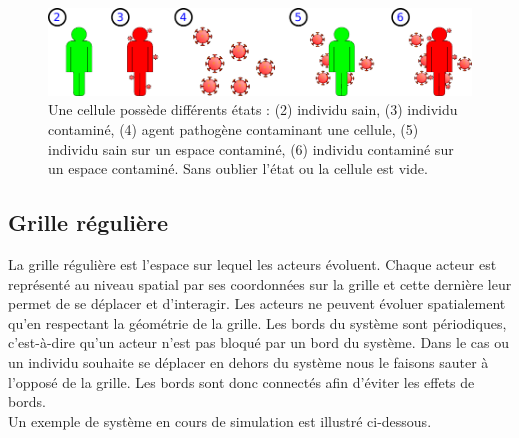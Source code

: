 \begin{figure}[h]
	\centering
	\captionsetup{justification=centering}
	\includegraphics[scale=0.7]{Images/cell_states.pdf}
	\caption[Différents états de la cellule]{Une cellule possède différents états : (2) individu sain, (3) individu contaminé, (4) agent pathogène contaminant une cellule, (5) individu sain sur un espace contaminé, (6) individu contaminé sur un espace contaminé. Sans oublier l'état ou la cellule est vide.  }
\end{figure}

\newpage

\subsection{Grille régulière}

La grille régulière est l'espace sur lequel les acteurs évoluent. Chaque acteur est représenté au niveau spatial par ses coordonnées sur la grille et cette dernière leur permet de se déplacer et d'interagir. Les acteurs ne peuvent évoluer spatialement qu'en respectant la géométrie de la grille. Les bords du système sont périodiques, c'est-à-dire qu'un acteur n'est pas bloqué par un bord du système. Dans le cas ou un individu souhaite se déplacer en dehors du système nous le faisons sauter à l'opposé de la grille. Les bords sont donc connectés afin d'éviter les effets de bords. \\

Un exemple de système en cours de simulation est illustré ci-dessous.

